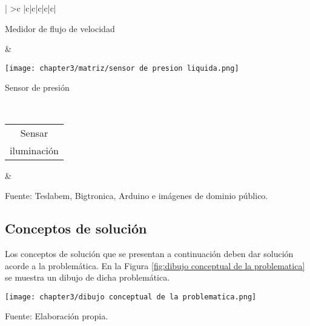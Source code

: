 \begin{landscape}
\begin{longtable}{|
			>{}c |c|c|c|c|c|}
\begin{minipage}{\mymaxsizeofcontenttable}
			\begin{myflushcenter}
				{\footnotesize Medidor de flujo de velocidad}
			\end{myflushcenter}
		\end{minipage} &
		\begin{minipage}{\mymaxsizeofcontenttable}
			\footnotesize\centering\texttt{[image: chapter3/matriz/sensor de presion liquida.png]} \\ 
			\begin{myflushcenter}
				{\footnotesize Sensor de presión}
			\end{myflushcenter}
		\end{minipage} \\ \hline
		\begin{tabular}[c]{@{}c@{}}Sensar\\ iluminación\end{tabular} &
		 \\ \hline
	\end{longtable}	
	\begin{myflushcenteraftertable_landspace}
		Fuente: Teslabem, Bigtronica, Arduino e imágenes de dominio público.
	\end{myflushcenteraftertable_landspace}
\end{landscape}	


\newpage
\pagestyle{myportland}

\subsection{Conceptos de solución}

Los conceptos de solución que se presentan a continuación deben dar solución acorde a la problemática. En la Figura \ref{fig:dibujo conceptual de la problematica} se muestra un dibujo de dicha problemática.

\begin{myfigure}[H]
	\footnotesize\centering
	\texttt{[image: chapter3/dibujo conceptual de la problematica.png]}
	\caption{Dibujo conceptual de la problemática.}
	\begin{myflushcenter}
		Fuente: Elaboración propia.
	\end{myflushcenter}
	\label{fig:dibujo conceptual de la problematica}
\end{myfigure}

